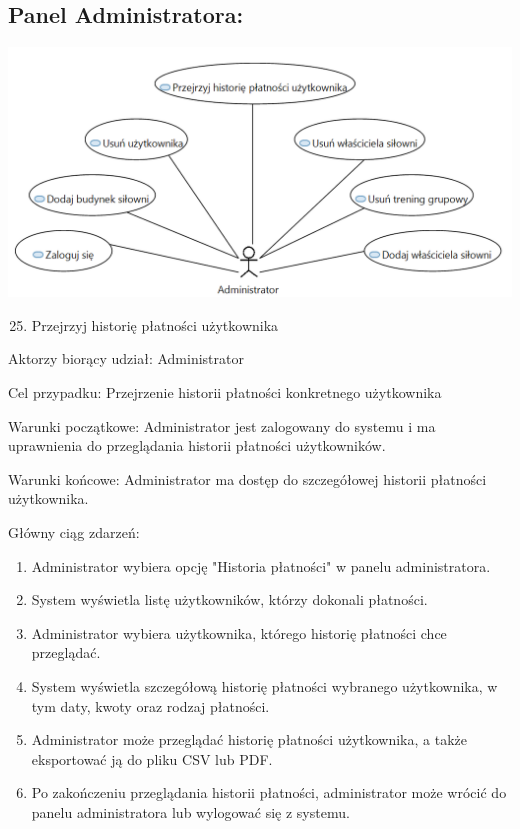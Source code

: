 \documentclass[
]{article}
\providecommand{\tightlist}{%
  \setlength{\itemsep}{0pt}\setlength{\parskip}{0pt}}
\begin{document}
\hypertarget{h.sjnlhh288rjz}{%
\subsection{\texorpdfstring{{Panel
Administratora:}}{Panel Administratora:}}\label{h.sjnlhh288rjz}}

{\includegraphics{diagrams/use_cases/administrator.png}}

\begin{enumerate}
\setcounter{enumi}{24}
\tightlist
\item
  {Przejrzyj historię płatności użytkownika}
\end{enumerate}

{Aktorzy biorący udział: Administrator}

{Cel przypadku: Przejrzenie historii płatności konkretnego użytkownika}

{Warunki początkowe: Administrator jest zalogowany do systemu i ma
uprawnienia do przeglądania historii płatności użytkowników.}

{Warunki końcowe: Administrator ma dostęp do szczegółowej historii
płatności użytkownika.}

{Główny ciąg zdarzeń:}

\begin{enumerate}
\tightlist
\item
  {Administrator wybiera opcję "Historia płatności" w panelu
  administratora.}
\item
  {System wyświetla listę użytkowników, którzy dokonali płatności.}
\item
  {Administrator wybiera użytkownika, którego historię płatności chce
  przeglądać.}
\item
  {System wyświetla szczegółową historię płatności wybranego
  użytkownika, w tym daty, kwoty oraz rodzaj płatności.}
\item
  {Administrator może przeglądać historię płatności użytkownika, a także
  eksportować ją do pliku CSV lub PDF.}
\item
  {Po zakończeniu przeglądania historii płatności, administrator może
  wrócić do panelu administratora lub wylogować się z systemu.}
\end{enumerate}
\end{document}
